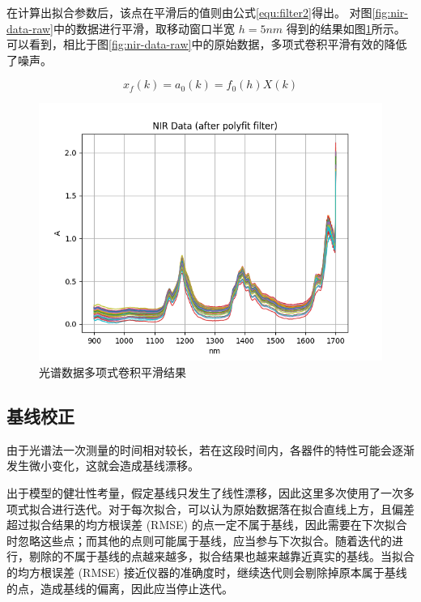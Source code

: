 \documentclass[a4paper]{article}
\begin{document}
			在计算出拟合参数后，该点在平滑后的值则由公式\eqref{equ:filter2}得出。
			对图\ref{fig:nir-data-raw}中的数据进行平滑，取移动窗口半宽 $h = 5nm$ 得到的结果如图\ref{fig:filter}所示。
			可以看到，相比于图\ref{fig:nir-data-raw}中的原始数据，多项式卷积平滑有效的降低了噪声。
			
			\begin{equation}\label{equ:filter2}
				x_f(k) = a_0(k) = f_0(h)X(k)
			\end{equation}
			
			\begin{figure}[h]
				\centering
				\includegraphics[width=\linewidth]{../img/filter}
				\caption{光谱数据多项式卷积平滑结果}
				\label{fig:filter}
			\end{figure}
			
		\subsection{基线校正}
			由于光谱法一次测量的时间相对较长，若在这段时间内，各器件的特性可能会逐渐发生微小变化，这就会造成基线漂移。
			
			出于模型的健壮性考量，假定基线只发生了线性漂移，因此这里多次使用了一次多项式拟合进行迭代。对于每次拟合，可以认为原始数据落在拟合直线上方，且偏差超过拟合结果的均方根误差 (RMSE) 的点一定不属于基线，因此需要在下次拟合时忽略这些点；而其他的点则可能属于基线，应当参与下次拟合。随着迭代的进行，剔除的不属于基线的点越来越多，拟合结果也越来越靠近真实的基线。当拟合的均方根误差 (RMSE) 接近仪器的准确度时，继续迭代则会剔除掉原本属于基线的点，造成基线的偏离，因此应当停止迭代。
			
\end{document}
